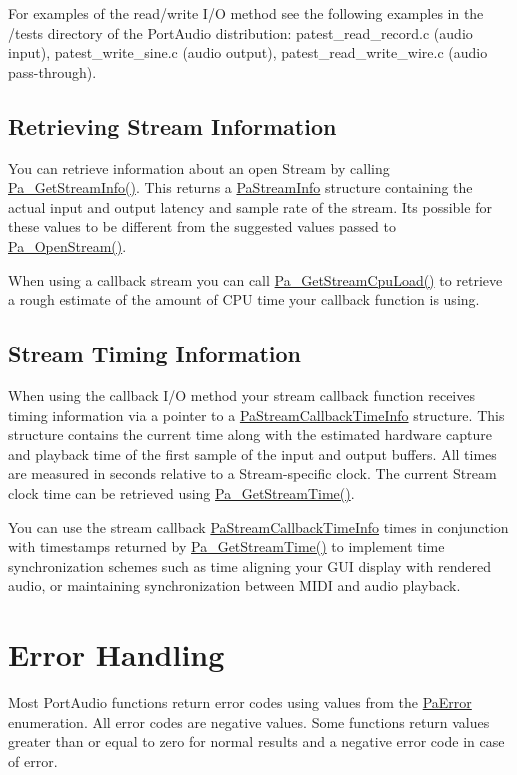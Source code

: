 For examples of the read/write I/O method see the following examples in the /tests directory of the Port\+Audio distribution\+: patest\+\_\+read\+\_\+record.\+c (audio input), patest\+\_\+write\+\_\+sine.\+c (audio output), patest\+\_\+read\+\_\+write\+\_\+wire.\+c (audio pass-\/through).\hypertarget{api_overview_stream_info}{}\subsection{Retrieving Stream Information}\label{api_overview_stream_info}
You can retrieve information about an open Stream by calling \hyperlink{portaudio_8h_a3d9c4cbda4e9f381b76f287c3de8a758}{Pa\+\_\+\+Get\+Stream\+Info()}. This returns a \hyperlink{struct_pa_stream_info}{Pa\+Stream\+Info} structure containing the actual input and output latency and sample rate of the stream. It\textquotesingle{}s possible for these values to be different from the suggested values passed to \hyperlink{portaudio_8h_a443ad16338191af364e3be988014cbbe}{Pa\+\_\+\+Open\+Stream()}.

When using a callback stream you can call \hyperlink{portaudio_8h_a83b8c624464dd7bb6a01b06ab596c115}{Pa\+\_\+\+Get\+Stream\+Cpu\+Load()} to retrieve a rough estimate of the amount of C\+PU time your callback function is using.\hypertarget{api_overview_stream_timing}{}\subsection{Stream Timing Information}\label{api_overview_stream_timing}
When using the callback I/O method your stream callback function receives timing information via a pointer to a \hyperlink{struct_pa_stream_callback_time_info}{Pa\+Stream\+Callback\+Time\+Info} structure. This structure contains the current time along with the estimated hardware capture and playback time of the first sample of the input and output buffers. All times are measured in seconds relative to a Stream-\/specific clock. The current Stream clock time can be retrieved using \hyperlink{portaudio_8h_a2b3fb60e6949f37f7f134105ff425749}{Pa\+\_\+\+Get\+Stream\+Time()}.

You can use the stream callback \hyperlink{struct_pa_stream_callback_time_info}{Pa\+Stream\+Callback\+Time\+Info} times in conjunction with timestamps returned by \hyperlink{portaudio_8h_a2b3fb60e6949f37f7f134105ff425749}{Pa\+\_\+\+Get\+Stream\+Time()} to implement time synchronization schemes such as time aligning your G\+UI display with rendered audio, or maintaining synchronization between M\+I\+DI and audio playback.\hypertarget{api_overview_error_handling}{}\section{Error Handling}\label{api_overview_error_handling}
Most Port\+Audio functions return error codes using values from the \hyperlink{portaudio_8h_a4949e4a8ef9f9dbe8cbee414ce69841d}{Pa\+Error} enumeration. All error codes are negative values. Some functions return values greater than or equal to zero for normal results and a negative error code in case of error.

